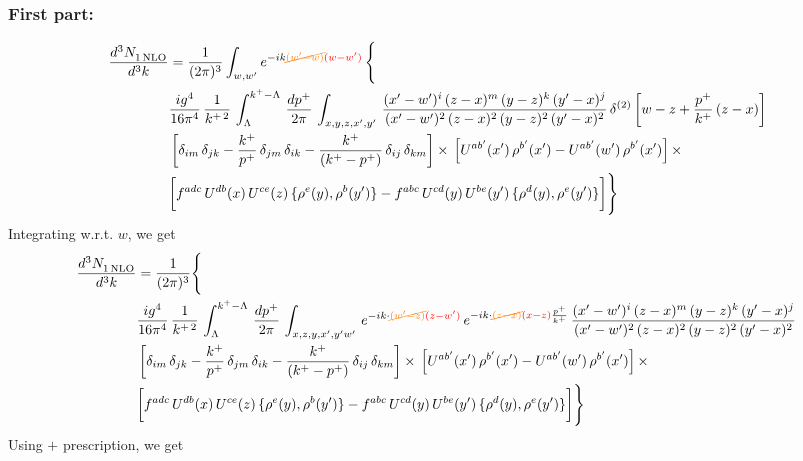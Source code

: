 \documentclass[9pt]{article}
\numberwithin{equation}{section}
\begin{document}
\subsubsection{First part:}
\begin{align}
    \frac{d^{3}N_{1\,\rm NLO}^{\rm}}{d^{3}k}  & = \frac{1}{(2\pi)^{3}}  \int_{w, w^\prime} e^{-ik{\color{orange}\cancel{(w^\prime-w)}}{\color{red}(w-w^\prime)}}\, \Bigg\{\notag \\ & \frac{ig^{4}}{16\pi^{4}}\, \frac{1}{k^{+\,2}}\,\int_{\Lambda}^{k^{+}-\Lambda}\, \frac{dp^{+}}{2\pi}\,\int_{x,y,z,x',y'}\,\frac{(x'-w')^{i}\,(z-x)^{m}\,(y-z)^{k}\,(y'-x)^{j}}{(x'-w')^{2}\,(z-x)^{2}\,(y-z)^{2}\,(y'-x)^{2}}\, \delta^{(2)}\left[w-z+\frac{p^{+}}{k^{+}}\,(z-x)\right]\notag \\ & \left[\delta_{im}\,\delta_{jk}-\frac{k^{+}}{p^{+}}\, \delta_{jm}\,\delta_{ik}-\frac{k^{+}}{(k^{+}-p^{+})}\, \delta_{ij}\,\delta_{km}\right]\times\, \left[U^{ab'}(x')\,\rho^{b'}(x')-U^{ab'}(w')\,\rho^{b'}(x')\right]\times\notag \\ & \bigg[f^{adc}\,U^{db}(x)\,U^{ce}(z)\, \{\rho^{e}(y),\rho^{b}(y')\}-f^{abc}\,U^{cd}(y)\,U^{be}(y')\, \{\rho^{d}(y),\rho^{e}(y')\}\bigg]\Bigg\}
\end{align}
Integrating w.r.t. $w$, we get
\begin{align}
     \frac{d^{3}N_{1\,\rm NLO}^{\rm}}{d^{3}k}  & = \frac{1}{(2\pi)^{3}} \Bigg\{\notag \\ &  \frac{ig^{4}}{16\pi^{4}}\, \frac{1}{k^{+\,2}}\,\int_{\Lambda}^{k^{+}-\Lambda}\, \frac{dp^{+}}{2\pi}\,\int_{x,z,y,x',y'w'}\,e^{-ik\cdot {\color{orange}\cancel{(w^\prime-z)}}{\color{red}(z-w^\prime)}}\,e^{-ik\cdot {\color{orange}\cancel{(z-x)}}{\color{red}(x-z)}\frac{p^{+}}{k^{+}}}\,\frac{(x'-w')^{i}\,(z-x)^{m}\,(y-z)^{k}\,(y'-x)^{j}}{(x'-w')^{2}\,(z-x)^{2}\,(y-z)^{2}\,(y'-x)^{2}}\,\notag \\ & \left[\delta_{im}\,\delta_{jk}-\frac{k^{+}}{p^{+}}\, \delta_{jm}\,\delta_{ik}-\frac{k^{+}}{(k^{+}-p^{+})}\, \delta_{ij}\,\delta_{km}\right]\times\, \left[U^{ab'}(x')\,\rho^{b'}(x')-U^{ab'}(w')\,\rho^{b'}(x')\right]\times\notag \\ & \bigg[f^{adc}\,U^{db}(x)\,U^{ce}(z)\, \{\rho^{e}(y),\rho^{b}(y')\}-f^{abc}\,U^{cd}(y)\,U^{be}(y')\, \{\rho^{d}(y),\rho^{e}(y')\}\bigg]\Bigg\}
\end{align}
Using $+$ prescription, we get
\end{document}
